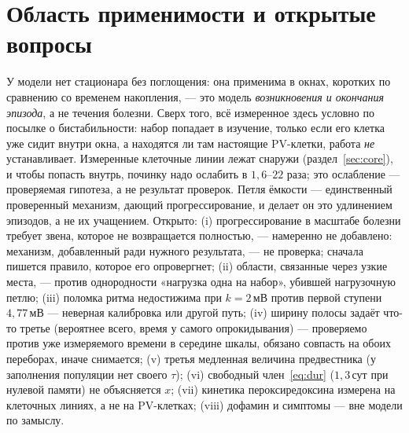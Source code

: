 \documentclass[11pt,a4paper]{article}
\theoremstyle{remark}
\begin{document}
\section{Область применимости и открытые вопросы}\label{sec:scope}
У модели нет стационара без поглощения: она применима в окнах, коротких по сравнению
со временем накопления, --- это модель \emph{возникновения и окончания эпизода}, а не
течения болезни. Сверх того, всё измеренное здесь условно по посылке о бистабильности: набор
попадает в изучение, только если его клетка уже сидит внутри окна, а находятся ли там
настоящие PV-клетки, работа \emph{не} устанавливает. Измеренные клеточные линии лежат снаружи
(раздел~\ref{sec:core}), и чтобы попасть внутрь, починку надо ослабить в $1{,}6$--$22$ раза;
это ослабление --- проверяемая гипотеза, а не результат проверок. Петля ёмкости --- единственный проверенный механизм, дающий
прогрессирование, и делает он это удлинением эпизодов, а не их учащением. Открыто:
(i) прогрессирование в масштабе болезни требует звена, которое не возвращается
полностью, --- намеренно не добавлено: механизм, добавленный ради нужного результата,
--- не проверка; сначала пишется правило, которое его опровергнет;
(ii) области, связанные через узкие места, --- против однородности «нагрузка одна на
набор», убившей нагрузочную петлю; (iii) поломка ритма недостижима при $k=2$\,мВ
против первой ступени $4{,}77$\,мВ --- неверная калибровка или другой путь;
(iv) ширину полосы задаёт что-то третье (вероятнее всего, время у самого
опрокидывания) --- проверяемо против уже измеряемого времени в середине шкалы,
обязано совпасть на обоих переборах, иначе снимается; (v) третья медленная величина
предвестника (у заполнения популяции нет своего $\tau$); (vi) свободный
член~\eqref{eq:dur} ($1{,}3$\,сут при нулевой памяти) не объясняется $x$;
(vii) кинетика пероксиредоксина измерена на клеточных линиях, а не на PV-клетках;
(viii) дофамин и симптомы --- вне модели по замыслу.

\smallskip
{}
\end{document}
